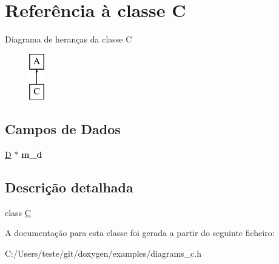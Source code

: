 \hypertarget{class_c}{\section{Referência à classe C}
\label{class_c}
}
Diagrama de heranças da classe C\begin{figure}[H]
\begin{center}
\leavevmode
\includegraphics[height=2.000000cm]{class_c}
\end{center}
\end{figure}
\subsection*{Campos de Dados}
\begin{DoxyCompactItemize}
\item 
\hypertarget{class_c_ae04072c75ba8f2a27c527e7c37213361}{\hyperlink{class_d}{D} $\ast$ {\bfseries m\-\_\-d}}\label{class_c_ae04072c75ba8f2a27c527e7c37213361}

\end{DoxyCompactItemize}


\subsection{Descrição detalhada}
class \hyperlink{class_c}{C} 

A documentação para esta classe foi gerada a partir do seguinte ficheiro\-:\begin{DoxyCompactItemize}
\item 
C\-:/\-Users/teste/git/doxygen/examples/diagrams\-\_\-c.\-h\end{DoxyCompactItemize}
